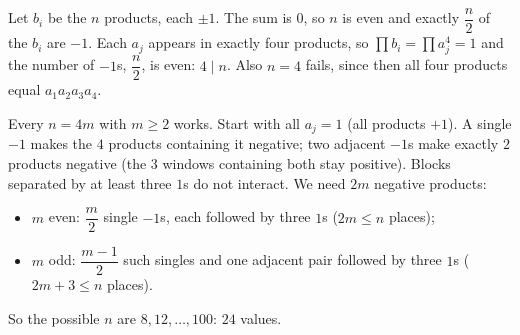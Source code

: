 Let $b_i$ be the $n$ products, each $\pm1$. The sum is $0$, so $n$ is even and exactly $\dfrac n2$ of the $b_i$ are $-1$. Each $a_j$ appears in exactly four products, so $\prod b_i=\prod a_j^4=1$ and the number of $-1$s, $\dfrac n2$, is even: $4\mid n$. Also $n=4$ fails, since then all four products equal $a_1a_2a_3a_4$.

Every $n=4m$ with $m\ge2$ works. Start with all $a_j=1$ (all products $+1$). A single $-1$ makes the $4$ products containing it negative; two adjacent $-1$s make exactly $2$ products negative (the $3$ windows containing both stay positive). Blocks separated by at least three $1$s do not interact. We need $2m$ negative products:
\begin{itemize}
\item $m$ even: $\dfrac m2$ single $-1$s, each followed by three $1$s ($2m\le n$ places);
\item $m$ odd: $\dfrac{m-1}2$ such singles and one adjacent pair followed by three $1$s ($2m+3\le n$ places).
\end{itemize}
So the possible $n$ are $8,12,\dots,100$: $\boxed{24}$ values.
